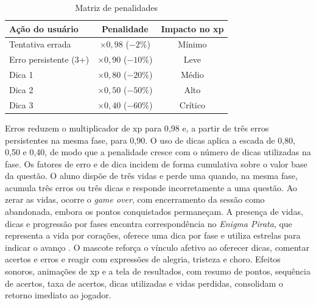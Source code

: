 \begin{table}[htbp]

  \centering

  \caption{\label{table:penalidades_xp}Matriz de penalidades}

  \begin{tabular}{lcc}

  \hline

  \textbf{Ação do usuário} & \textbf{Penalidade} & \textbf{Impacto no \gls{xp}} \\ \hline

  Tentativa errada & $\times 0{,}98$ ($-2\%$) & Mínimo \\ \hline

  Erro persistente (3+) & $\times 0{,}90$ ($-10\%$) & Leve \\ \hline

  Dica 1 & $\times 0{,}80$ ($-20\%$) & Médio \\ \hline

  Dica 2 & $\times 0{,}50$ ($-50\%$) & Alto \\ \hline

  Dica 3 & $\times 0{,}40$ ($-60\%$) & Crítico \\ \hline

  \end{tabular}


\end{table}

Erros reduzem o multiplicador de \gls{xp} para 0,98 e, a partir de três erros
persistentes na mesma fase, para 0,90. O uso de dicas aplica a escada de 0,80,
0,50 e 0,40, de modo que a penalidade cresce com o número de dicas utilizadas na
fase. Os fatores de erro e de dica incidem de forma cumulativa sobre o valor base
da questão. O aluno dispõe de três vidas e perde uma quando, na mesma fase,
acumula três erros ou três dicas e responde incorretamente a uma questão. Ao zerar as
vidas, ocorre o \textit{game over}, com encerramento da sessão como abandonada,
embora os pontos conquistados permaneçam. A presença de vidas, dicas e progressão
por fases encontra correspondência no \textit{Enigma Pirata}, que representa a
vida por corações, oferece uma dica por fase e utiliza estrelas para indicar o
avanço \cite{lais2024}. O mascote reforça o vínculo afetivo ao oferecer dicas,
comentar acertos e erros e reagir com expressões de alegria, tristeza e choro.
Efeitos sonoros, animações de \gls{xp} e a tela de resultados, com resumo de
pontos, sequência de acertos, taxa de acertos, dicas utilizadas e vidas perdidas,
consolidam o retorno imediato ao jogador.

